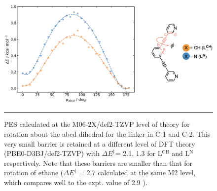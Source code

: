 \documentclass[../../main.tex]{subfiles}
\begin{document}
\begin{figure}[h!]
	\vspace{0.4cm}
	\centering
	\includegraphics[width=\textwidth]{3/da//figs/figS8}
	\vspace{0.2cm}
	\hrule
	\caption{PES calculated at the M06-2X/def2-TZVP level of theory for rotation about the abcd dihedral for the linker in C-1 and C-2. This very small barrier is retained at a different level of DFT theory (PBE0-D3BJ/def2-TZVP) with $\Delta E^\ddagger$= 2.1, 1.3 \kcalx for L${}^\text{CH}$ and L${}^\text{N}$ respectively. Note that these barriers are smaller than that for rotation of ethane ($\Delta E^\ddagger$ = 2.7 \kcalx calculated at the same M2 level, which compares well to the expt. \cite{Hirota1979} value of 2.9 \kcal).}
	\label{fig::si_da_8}
\end{figure}
\end{document}
